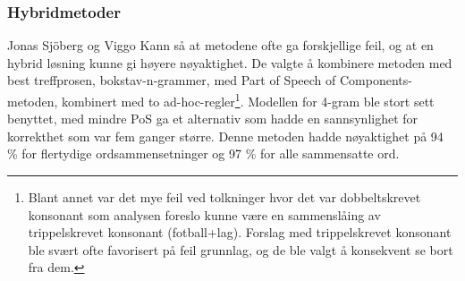 \subsubsection{Hybridmetoder}

Jonas Sjöberg og Viggo Kann så at metodene ofte ga forskjellige feil, og at en hybrid løsning kunne gi høyere nøyaktighet. De valgte å kombinere metoden med best treffprosen, bokstav-n-grammer, med Part of Speech of Components-metoden, kombinert med to ad-hoc-regler\footnote{Blant annet var det mye feil ved tolkninger hvor det var dobbeltskrevet konsonant som analysen foreslo kunne være en sammenslåing av trippelskrevet konsonant (fotball+lag). Forslag med trippelskrevet konsonant ble svært ofte favorisert på feil grunnlag, og de ble valgt å konsekvent se bort fra dem.}. Modellen for 4-gram ble stort sett benyttet, med mindre PoS ga et alternativ som hadde en sannsynlighet for korrekthet som var fem ganger større. Denne metoden hadde nøyaktighet på 94 \% for flertydige ordsammensetninger og 97 \% for alle sammensatte ord. 